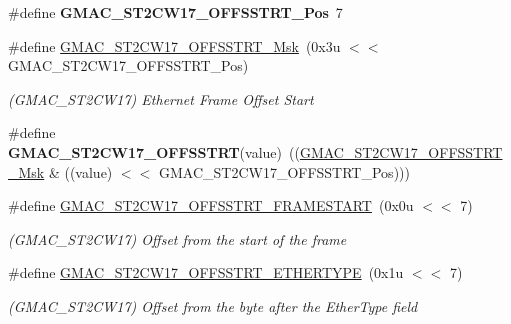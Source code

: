 \begin{DoxyCompactItemize}
\item 
\mbox{\label{group__SAMV71__GMAC_ga3371955e2613807c9d42785e327a78d5}} 
\#define {\bfseries G\+M\+A\+C\+\_\+\+S\+T2\+C\+W17\+\_\+\+O\+F\+F\+S\+S\+T\+R\+T\+\_\+\+Pos}~7
\item 
\mbox{\label{group__SAMV71__GMAC_ga23d094259c94b87abb7a505ace1f504e}} 
\#define \mbox{\hyperlink{group__SAMV71__GMAC_ga23d094259c94b87abb7a505ace1f504e}{G\+M\+A\+C\+\_\+\+S\+T2\+C\+W17\+\_\+\+O\+F\+F\+S\+S\+T\+R\+T\+\_\+\+Msk}}~(0x3u $<$$<$ G\+M\+A\+C\+\_\+\+S\+T2\+C\+W17\+\_\+\+O\+F\+F\+S\+S\+T\+R\+T\+\_\+\+Pos)
\begin{DoxyCompactList}\small\item\em (G\+M\+A\+C\+\_\+\+S\+T2\+C\+W17) Ethernet Frame Offset Start \end{DoxyCompactList}\item 
\mbox{\label{group__SAMV71__GMAC_ga0eb7f783e9dcb0a5ac0c2778c096eaa9}} 
\#define {\bfseries G\+M\+A\+C\+\_\+\+S\+T2\+C\+W17\+\_\+\+O\+F\+F\+S\+S\+T\+RT}(value)~((\mbox{\hyperlink{group__SAMV71__GMAC_ga23d094259c94b87abb7a505ace1f504e}{G\+M\+A\+C\+\_\+\+S\+T2\+C\+W17\+\_\+\+O\+F\+F\+S\+S\+T\+R\+T\+\_\+\+Msk}} \& ((value) $<$$<$ G\+M\+A\+C\+\_\+\+S\+T2\+C\+W17\+\_\+\+O\+F\+F\+S\+S\+T\+R\+T\+\_\+\+Pos)))
\item 
\mbox{\label{group__SAMV71__GMAC_ga8cb6fd5d17dc67fb6108755311b9bad4}} 
\#define \mbox{\hyperlink{group__SAMV71__GMAC_ga8cb6fd5d17dc67fb6108755311b9bad4}{G\+M\+A\+C\+\_\+\+S\+T2\+C\+W17\+\_\+\+O\+F\+F\+S\+S\+T\+R\+T\+\_\+\+F\+R\+A\+M\+E\+S\+T\+A\+RT}}~(0x0u $<$$<$ 7)
\begin{DoxyCompactList}\small\item\em (G\+M\+A\+C\+\_\+\+S\+T2\+C\+W17) Offset from the start of the frame \end{DoxyCompactList}\item 
\mbox{\label{group__SAMV71__GMAC_ga73d161ed3af736b0f89b96c22a4d1090}} 
\#define \mbox{\hyperlink{group__SAMV71__GMAC_ga73d161ed3af736b0f89b96c22a4d1090}{G\+M\+A\+C\+\_\+\+S\+T2\+C\+W17\+\_\+\+O\+F\+F\+S\+S\+T\+R\+T\+\_\+\+E\+T\+H\+E\+R\+T\+Y\+PE}}~(0x1u $<$$<$ 7)
\begin{DoxyCompactList}\small\item\em (G\+M\+A\+C\+\_\+\+S\+T2\+C\+W17) Offset from the byte after the Ether\+Type field \end{DoxyCompactList}\item 

\end{DoxyCompactItemize}
